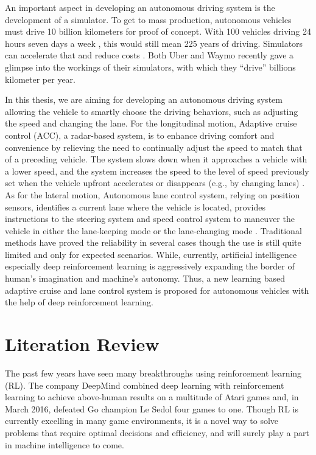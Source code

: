 An important aspect in developing an autonomous driving system is the development of a simulator. To get to mass production, autonomous vehicles must drive 10 billion kilometers for proof of concept. With 100 vehicles driving 24 hours seven days a week , this would still mean 225 years of driving. Simulators can accelerate that and reduce costs \cite{Appolo}. Both Uber and Waymo recently gave a glimpse into the workings of their simulators, with which they ``drive'' billions kilometer per year.


In this thesis, we are aiming for developing an autonomous driving system allowing the vehicle to smartly choose the driving behaviors, such as adjusting the speed and changing the lane. For the longitudinal motion, Adaptive cruise control (ACC), a radar-based system, is to enhance driving comfort and convenience by relieving the need to continually adjust the speed to match that of a preceding vehicle. The system slows down when it approaches a vehicle with a lower speed, and the system increases the speed to the level of speed previously set when the vehicle upfront accelerates or disappears (e.g., by changing lanes) \cite{ACC2002}. As for the lateral motion, Autonomous lane control system, relying on position sensors, identifies a current lane where the vehicle is located, provides instructions to the steering system and speed control system to maneuver the vehicle in either the lane-keeping mode or the lane-changing mode \cite{LaneControl2012}. Traditional methods have proved the reliability in several cases though the use is still quite limited and only for expected scenarios. While, currently, artificial intelligence especially deep reinforcement learning is aggressively expanding the border of human's imagination and machine's autonomy. Thus, a new learning based adaptive cruise and lane control system is proposed for autonomous vehicles with the help of deep reinforcement learning.

\section{Literation Review}

The past few years have seen many breakthroughs using reinforcement learning (RL). The company DeepMind combined deep learning with reinforcement learning to achieve above-human results on a multitude of Atari games and, in March 2016, defeated Go champion Le Sedol four games to one. Though RL is currently excelling in many game environments, it is a novel way to solve problems that require optimal decisions and efficiency, and will surely play a part in machine intelligence to come.

